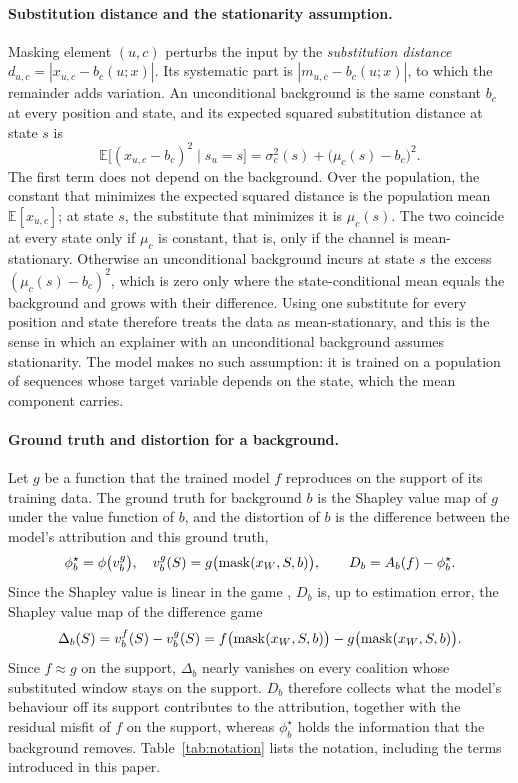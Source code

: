 \documentclass{article}
\begin{document}
\paragraph{Substitution distance and the stationarity assumption.} Masking element $(u,c)$ perturbs the input by the \emph{substitution distance} $d_{u,c} = |x_{u,c}-b_c(u;x)|$. Its systematic part is $|m_{u,c}-b_c(u;x)|$, to which the remainder adds variation. An unconditional background is the same constant $b_c$ at every position and state, and its expected squared substitution distance at state $s$ is
\begin{equation}\label{eq:excess}
\mathbb{E}\bigl[(x_{u,c}-b_c)^2\mid s_u=s\bigr] = \sigma^2_c(s) + \bigl(\mu_c(s)-b_c\bigr)^2 .
\end{equation}
The first term does not depend on the background. Over the population, the constant that minimizes the expected squared distance is the population mean $\mathbb{E}[x_{u,c}]$; at state $s$, the substitute that minimizes it is $\mu_c(s)$. The two coincide at every state only if $\mu_c$ is constant, that is, only if the channel is mean-stationary. Otherwise an unconditional background incurs at state $s$ the excess $(\mu_c(s)-b_c)^2$, which is zero only where the state-conditional mean equals the background and grows with their difference. Using one substitute for every position and state therefore treats the data as mean-stationary, and this is the sense in which an explainer with an unconditional background assumes stationarity. The model makes no such assumption: it is trained on a population of sequences whose target variable depends on the state, which the mean component carries.

\paragraph{Ground truth and distortion for a background.} Let $g$ be a function that the trained model $f$ reproduces on the support of its training data. The ground truth for background $b$ is the Shapley value map of $g$ under the value function of $b$, and the distortion of $b$ is the difference between the model's attribution and this ground truth,
\begin{equation}\label{eq:gt}
\phi^\star_b = \phi\bigl(v^g_b\bigr), \quad v^g_b(S) = g\bigl(\operatorname{mask}(x_W,S,b)\bigr), \qquad D_b = A_b(f) - \phi^\star_b .
\end{equation}
Since the Shapley value is linear in the game \citep{sundararajan2020many}, $D_b$ is, up to estimation error, the Shapley value map of the difference game
\begin{equation}\label{eq:diffgame}
\Delta_b(S) = v^f_b(S)-v^g_b(S) = f\bigl(\operatorname{mask}(x_W,S,b)\bigr)-g\bigl(\operatorname{mask}(x_W,S,b)\bigr).
\end{equation}
Since $f\approx g$ on the support, $\Delta_b$ nearly vanishes on every coalition whose substituted window stays on the support. $D_b$ therefore collects what the model's behaviour off its support contributes to the attribution, together with the residual misfit of $f$ on the support, whereas $\phi^\star_b$ holds the information that the background removes. Table~\ref{tab:notation} lists the notation, including the terms introduced in this paper.
\end{document}
